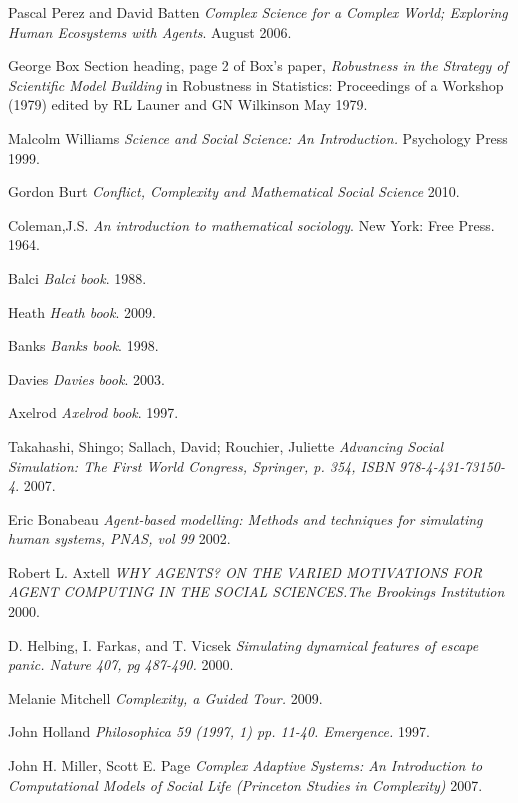 \documentclass[11pt,oneside,a4paper,openright]{report}
\begin{document}
\begin{thebibliography}{13}
	Pascal Perez and David Batten
	\emph{Complex Science for a Complex World; Exploring Human Ecosystems with Agents}. 
	August 2006.

	George Box 
	Section heading, page 2 of Box's paper, 
	\emph{Robustness in the Strategy of Scientific Model Building} in Robustness in Statistics: Proceedings of a Workshop (1979) 
	edited by RL Launer and GN Wilkinson
	May 1979.

	Malcolm Williams
	\emph{Science and Social Science: An Introduction.} Psychology Press 
	1999. 

	Gordon Burt
	\emph{Conflict, Complexity and Mathematical Social Science}
	2010.

	Coleman,J.S.
	\emph{An introduction to mathematical sociology}. New York: Free Press.
	1964.

	Balci
	\emph{Balci book}.
	1988.

	Heath
	\emph{Heath book}.
	2009.

	Banks
	\emph{Banks book}.
	1998.

	Davies
	\emph{Davies book}.
	2003.

	Axelrod
	\emph{Axelrod book}.
	1997.

	Takahashi, Shingo; Sallach, David; Rouchier, Juliette
	\emph{Advancing Social Simulation: The First World Congress, Springer, p. 354, ISBN 978-4-431-73150-4}.
	2007.

	Eric Bonabeau
	\emph{Agent-based modelling: Methods and techniques for simulating human systems, PNAS, vol 99} 
	2002.

	Robert L. Axtell
	\emph{WHY AGENTS? ON THE VARIED MOTIVATIONS FOR AGENT COMPUTING IN THE SOCIAL SCIENCES.The Brookings Institution}
	2000.

	D. Helbing, I. Farkas, and T. Vicsek 
	\emph{Simulating dynamical features of escape panic. Nature 407, pg 487-490.}
	2000.

	Melanie Mitchell
	\emph{Complexity, a Guided Tour.}
	2009.

	John Holland
	\emph{Philosophica 59 (1997, 1) pp. 11-40. Emergence.}
	1997.

	John H. Miller, Scott E. Page
	\emph{Complex Adaptive Systems: An Introduction to Computational Models of Social Life (Princeton Studies in Complexity)}
	2007.


\end{thebibliography}
\end{document}
